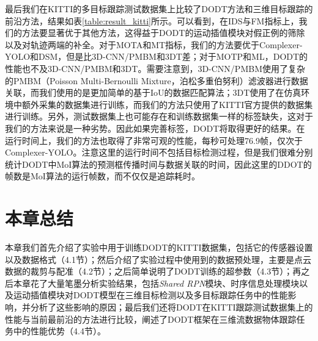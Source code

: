 最后我们在KITTI的多目标跟踪测试数据集上比较了DODT方法和三维目标跟踪的前沿方法，结果如表\ref{table:result_kitti}所示。可以看到，在IDS与FM指标上，我们的方法要显著优于其他方法，这得益于DODT的运动插值模块对假正例的筛除以及对轨迹两端的补全。对于MOTA和MT指标，我们的方法要优于Complexer-YOLO和DSM，但是比3D-CNN/PMBM和3DT差；对于MOTP和ML，DODT的性能也不及3D-CNN/PMBM和3DT。需要注意到，3D-CNN/PMBM使用了复杂的PMBM（Poisson Multi-Bernoulli Mixture，泊松多重伯努利）滤波器进行数据关联，而我们使用的是更加简单的基于IoU的数据匹配算法；3DT使用了在仿真环境中额外采集的数据集进行训练，而我们的方法只使用了KITTI官方提供的数据集进行训练。另外，测试数据集上也可能存在和训练数据集一样的标签缺失，这对于我们的方法来说是一种劣势。因此如果完善标签，DODT将取得更好的结果。在运行时间上，我们的方法也取得了非常可观的性能，每秒可处理76.9帧，仅次于Complexer-YOLO。注意这里的运行时间不包括目标检测过程，但是我们很难分别统计DODT中MoI算法的预测框传播时间与数据关联的时间，因此这里的DDOT的帧数是MoI算法的运行帧数，而不仅仅是追踪耗时。

\section{本章总结}
\label{exp_conclusion}
本章我们首先介绍了实验中用于训练DODT的KITTI数据集，包括它的传感器设置以及数据格式（4.1节）；然后介绍了实验过程中使用到的数据预处理，主要是点云数据的裁剪与配准（4.2节）；之后简单说明了DODT训练的超参数（4.3节）；再之后本章花了大量笔墨分析实验结果，包括\textit{Shared RPN}模块、时序信息处理模块以及运动插值模块对DODT模型在三维目标检测以及多目标跟踪任务中的性能影响，并分析了这些影响的原因；最后我们还将DODT在KITTI跟踪测试数据集上的性能与当前最前沿的方法进行比较，阐述了DODT框架在三维流数据物体跟踪任务中的性能优势（4.4节）。

\ifprint
	\newpage
	\thispagestyle{empty}
	\mbox{}
	
	\clearpage
	\setcounter{page}{10}
\fi
